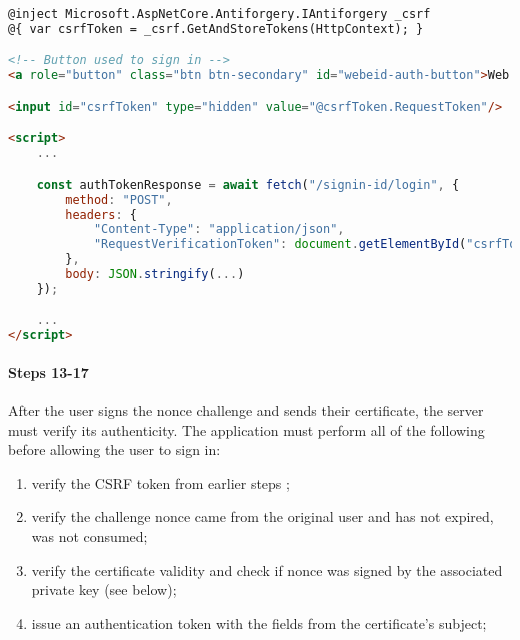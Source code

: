 \begin{lstlisting}[caption={Web eID UI excerpt}, label={lst:web-eid-challenge-ui}, language={html}]
@inject Microsoft.AspNetCore.Antiforgery.IAntiforgery _csrf
@{ var csrfToken = _csrf.GetAndStoreTokens(HttpContext); }

<!-- Button used to sign in -->
<a role="button" class="btn btn-secondary" id="webeid-auth-button">Web eID</a>

<input id="csrfToken" type="hidden" value="@csrfToken.RequestToken"/>

<script>
    ...

    const authTokenResponse = await fetch("/signin-id/login", {
        method: "POST",
        headers: {
            "Content-Type": "application/json",
            "RequestVerificationToken": document.getElementById("csrfToken").value
        },
        body: JSON.stringify(...)
    });

    ...
</script>
\end{lstlisting}

\paragraph{Steps 13-17}

After the user signs the nonce challenge and sends their certificate, the server must verify its authenticity. The application must perform all of the following before allowing the user to sign in:

\begin{enumerate}
  \item verify the CSRF token from earlier steps \cite{ria-webeid-source-web-eid-authtoken-validation-java-readme};
  \item verify the challenge nonce came from the original user and has not expired, was not consumed;
  \item verify the certificate validity and check if nonce was signed by the associated private key (see below);
  \item issue an authentication token with the fields from the certificate's subject;
\end{enumerate}

